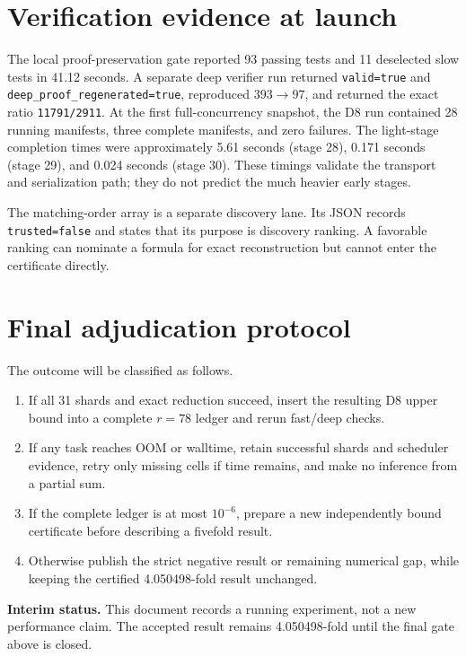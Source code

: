 \documentclass[10pt]{article}
\begin{document}
\section{Verification evidence at launch}

The local proof-preservation gate reported 93 passing tests and 11 deselected
slow tests in 41.12 seconds.  A separate deep verifier run returned
\texttt{valid=true} and \texttt{deep\_proof\_regenerated=true}, reproduced
$393\to97$, and returned the exact ratio \texttt{11791/2911}.  At the first
full-concurrency snapshot, the D8 run contained 28 running manifests, three
complete manifests, and zero failures.  The light-stage completion times were
approximately 5.61 seconds (stage 28), 0.171 seconds (stage 29), and 0.024
seconds (stage 30).  These timings validate the transport and serialization
path; they do not predict the much heavier early stages.

The matching-order array is a separate discovery lane.  Its JSON records
\texttt{trusted=false} and states that its purpose is discovery ranking.  A
favorable ranking can nominate a formula for exact reconstruction but cannot
enter the certificate directly.

\section{Final adjudication protocol}

The outcome will be classified as follows.
\begin{enumerate}
  \item If all 31 shards and exact reduction succeed, insert the resulting D8
        upper bound into a complete $r=78$ ledger and rerun fast/deep checks.
  \item If any task reaches OOM or walltime, retain successful shards and
        scheduler evidence, retry only missing cells if time remains, and make
        no inference from a partial sum.
  \item If the complete ledger is at most $10^{-6}$, prepare a new independently
        bound certificate before describing a fivefold result.
  \item Otherwise publish the strict negative result or remaining numerical
        gap, while keeping the certified 4.050498-fold result unchanged.
\end{enumerate}

\textbf{Interim status.}  This document records a running experiment, not a
new performance claim.  The accepted result remains 4.050498-fold until the
final gate above is closed.
\end{document}

